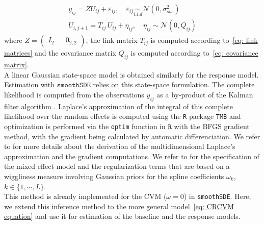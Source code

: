 \documentclass[aoas]{imsart}
\theoremstyle{definition}
\theoremstyle{remark}
\theoremstyle{remark}
\newcommand {\1}{\mathbb{1}}
\begin{document}
\begin{equation}
	\begin{array}{l}
		y_{ij}=ZU_{ij}+\varepsilon_{ij},  \quad 
		\varepsilon_{ij} \underset{i.i.d}{\sim} \mathcal{N}(0,\sigma_{obs}^2) \\
		U_{i,j+1}=T_{ij}\,U_{ij} + \eta_{ij}, \quad 
		\eta_{ij} \sim \mathcal{N}(0,Q_{ij})
	\end{array}
	\label{eq: RACVM state space}
\end{equation}
where $Z=\begin{pmatrix} I_2 && 0_{2,2}\end{pmatrix}$, the link matrix $T_{ij}$ is computed according to~\eqref{eq: link matrices} and the covariance matrix $Q_{ij}$ is computed according to~\eqref{eq: covariance matrix}.
\\
A linear Gaussian state-space model is obtained similarly for the response model. Estimation with $\texttt{smoothSDE}$ relies on this state-space formulation.
The complete likelihood is computed from the observations $y_{ij}$ as a by-product of the Kalman filter algorithm \citep{michelot_varying-coefficient_2021}.
Laplace's approximation of the integral of this complete likelihood over the random effects is computed using the \texttt{R} package \texttt{TMB}  and optimization is performed via the \texttt{optim} function in $\texttt{R}$ with the BFGS gradient method, with the gradient being calculated by automatic differenciation. We refer to \citep{kristensen_tmb_2016} for more details about the derivation of the multidimensional Laplace's approximation and the gradient computations. We refer to \cite[section 6.6]{wood_generalized_2017} for the specification of the mixed effect model and the regularization terms that are based on a wiggliness measure involving Gaussian priors for the spline coefficients $\omega_k$, $k \in \{1,\cdots,L\}$. \\
This method is already implemented for the CVM ($\omega=0$) in \texttt{smoothSDE}. Here, we extend this inference method to the more general model~\eqref{eq: CRCVM equation} and use it for estimation of the baseline and the response models.
\end{document}
